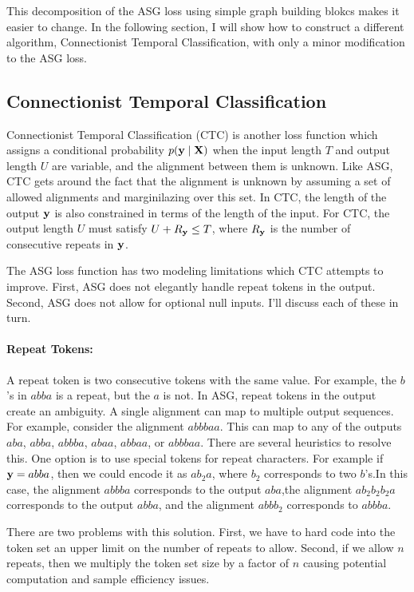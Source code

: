 This decomposition of the ASG loss using simple graph building blokcs makes it
easier to change. In the following section, I will show how to construct a
different algorithm, Connectionist Temporal Classification, with only a minor
modification to the ASG loss.

\subsection{Connectionist Temporal Classification}

Connectionist Temporal Classification (CTC) is another loss function which
assigns a conditional probability $p({\bf y} \mid {\bf X})$ when the input length $T$
and output length $U$ are variable, and the alignment between them is unknown.
Like ASG, CTC gets around the fact that the alignment is unknown by assuming a
set of allowed alignments and marginilazing over this set. In CTC, the length
of the output ${\bf y}$ is also constrained in terms of the length of the input.
For CTC, the output length $U$ must satisfy $U + R_{\bf y} \le T$, where $R_{\bf y}$ is
the number of consecutive repeats in ${\bf y}$.

The ASG loss function has two modeling limitations which CTC attempts to
improve. First, ASG does not elegantly handle repeat tokens in the output.
Second, ASG does not allow for optional null inputs. I'll discuss each of these
in turn.

\paragraph{Repeat Tokens:} A repeat token is two consecutive tokens with the
same value. For example, the $b$'s in $abba$ is a repeat, but the $a$ is not.
In ASG, repeat tokens in the output create an ambiguity. A single alignment can
map to multiple output sequences. For example, consider the alignment $abbbaa$.
This can map to any of the outputs $aba$, $abba$, $abbba$, $abaa$, $abbaa$, or
$abbbaa$. There are several heuristics to resolve this. One option is to use
special tokens for repeat characters. For example if ${\bf y} = abba$, then we
could encode it as $ab_2a$, where $b_2$ corresponds to two $b$'s.In this case,
the alignment $abbba$ corresponds to the output $aba$,the alignment
$ab_2b_2b_2a$ corresponds to the output $abba$, and the alignment $abbb_2$
corresponds to $abbba$.

There are two problems with this solution. First, we have to hard code into the
token set an upper limit on the number of repeats to allow. Second, if we allow
$n$ repeats, then we multiply the token set size by a factor of $n$ causing
potential computation and sample efficiency issues.

